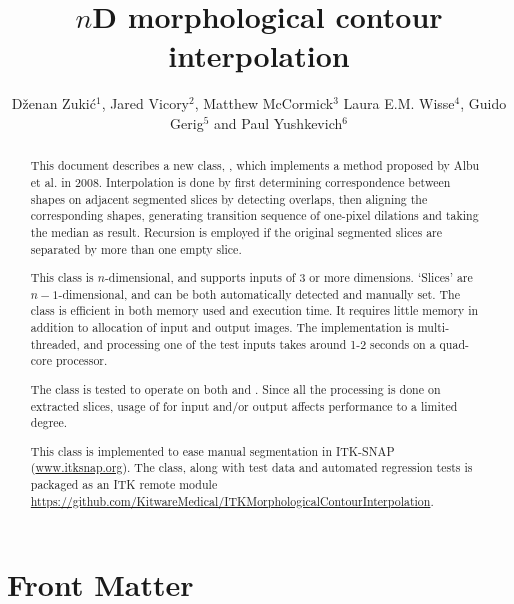 \documentclass{InsightArticle}
\title{$n$D morphological contour interpolation}
\author{D{\v z}enan Zuki{\' c}$^{1}$, Jared Vicory$^{2}$, Matthew McCormick$^{3}$
Laura E.M. Wisse$^{4}$, Guido Gerig$^{5}$ and Paul Yushkevich$^{6}$}
\newcommand{\IJhandlerIDnumber}{1338}
\begin{document}
\IJhandlefooter{\IJhandlerIDnumber}

\ifpdf
\else
\fi

\maketitle

\ifhtml
\chapter*{Front Matter\label{front}}
\fi


\begin{abstract}
\noindent
This document describes a new class, ,
which implements a method proposed by Albu et al. in 2008.
Interpolation is done by first determining correspondence between shapes on adjacent
segmented slices by detecting overlaps, then aligning the corresponding shapes,
generating transition sequence of one-pixel dilations and taking the median as result.
Recursion is employed if the original segmented slices are separated by more than one empty slice.


This class is $n$-dimensional, and supports inputs of 3 or more dimensions.
`Slices' are $n-1$-dimensional, and can be both automatically detected and manually set.
The class is efficient in both memory used and execution time.
It requires little memory in addition to allocation of input and output images.
The implementation is multi-threaded, and processing one of the test inputs
takes around 1-2 seconds on a quad-core processor.

The class is tested to operate on both  and .
Since all the processing is done on extracted slices,
usage of  for input and/or output affects performance to a limited degree.

This class is implemented to ease manual segmentation in ITK-SNAP (\url{www.itksnap.org}).
The class, along with test data and automated regression tests is packaged as an ITK
remote module \url{https://github.com/KitwareMedical/ITKMorphologicalContourInterpolation}.
\end{abstract}
\end{document}
